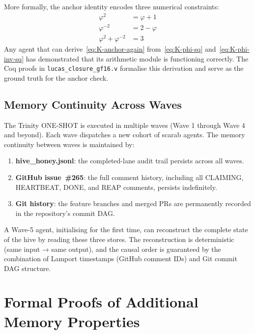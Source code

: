 More formally, the anchor identity encodes three numerical constraints:
\begin{align}
  \varphi^2 &= \varphi + 1 \label{eq:K-phi-sq} \\
  \varphi^{-2} &= 2 - \varphi \label{eq:K-phi-inv-sq} \\
  \varphi^2 + \varphi^{-2} &= 3 \label{eq:K-anchor-again}
\end{align}
Any agent that can derive~\eqref{eq:K-anchor-again}
from~\eqref{eq:K-phi-sq} and~\eqref{eq:K-phi-inv-sq} has
demonstrated that its arithmetic module is functioning correctly. The
Coq proofs in \texttt{lucas\_closure\_gf16.v} formalise this
derivation and serve as the ground truth for the anchor check.

\subsection{Memory Continuity Across Waves}
\label{ssec:K-wave-continuity}

The Trinity ONE-SHOT is executed in multiple waves (Wave 1 through
Wave 4 and beyond). Each wave dispatches a new cohort of scarab agents.
The memory continuity between waves is maintained by:
\begin{enumerate}
  \item \textbf{hive\_honey.jsonl}: the completed-lane audit trail
    persists across all waves.
  \item \textbf{GitHub issue~\#265}: the full comment history,
    including all CLAIMING, HEARTBEAT, DONE, and REAP comments,
    persists indefinitely.
  \item \textbf{Git history}: the feature branches and merged PRs are
    permanently recorded in the repository's commit DAG.
\end{enumerate}
A Wave-5 agent, initialising for the first time, can reconstruct the
complete state of the hive by reading these three stores. The
reconstruction is deterministic (same input → same output), and the
causal order is guaranteed by the combination of Lamport timestamps
(GitHub comment IDs) and Git commit DAG structure.


\section{Formal Proofs of Additional Memory Properties}
\label{sec:K-additional-proofs}

